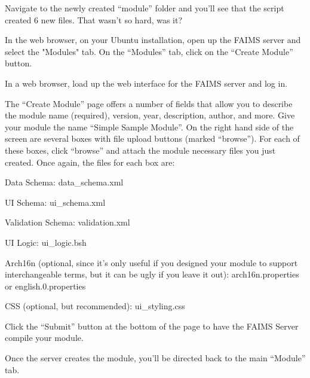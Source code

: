 Navigate to the newly created “module” folder and you'll see that the script created 6 new files. That wasn't so hard, was it?

{}

In the web browser, on your Ubuntu installation, open up the FAIMS server and select the "Modules" tab. On the “Modules” tab, click on the “Create Module” button.

{}

In a web browser, load up the web interface for the FAIMS server and log in.

The “Create Module” page offers a number of fields that allow you to describe the module name (required), version, year, description, author, and more. Give your module the name “Simple Sample Module”. On the right hand side of the screen are several boxes with file upload buttons (marked “browse”). For each of these boxes, click “browse” and attach the module necessary files you just created. Once again, the files for each box are:

\startitemize[n][stopper=.]
\item
  \startblockquote
  Data Schema: data_schema.xml
  \stopblockquote
\item
  \startblockquote
  UI Schema: ui_schema.xml
  \stopblockquote
\item
  \startblockquote
  Validation Schema: validation.xml
  \stopblockquote
\item
  \startblockquote
  UI Logic: ui_logic.bsh
  \stopblockquote
\item
  \startblockquote
  Arch16n (optional, since it's only useful if you designed your module to support interchangeable terms, but it can be ugly if you leave it out): arch16n.properties or english.0.properties
  \stopblockquote
\item
  \startblockquote
  CSS (optional, but recommended): ui_styling.css
  \stopblockquote
\stopitemize

{}

Click the “Submit” button at the bottom of the page to have the FAIMS Server compile your module.

{}

Once the server creates the module, you'll be directed back to the main “Module” tab.

